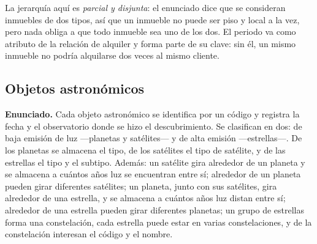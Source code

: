 La jerarquía aquí es \emph{parcial y disjunta}: el enunciado dice que se
consideran inmuebles de dos tipos, así que un inmueble no puede ser piso y local
a la vez, pero nada obliga a que todo inmueble sea uno de los dos. El periodo va
como atributo de la relación de alquiler y forma parte de su clave: sin él, un
mismo inmueble no podría alquilarse dos veces al mismo cliente.

\subsection{Objetos astronómicos}

\textbf{Enunciado.} Cada objeto astronómico se identifica por un código y
registra la fecha y el observatorio donde se hizo el descubrimiento. Se
clasifican en dos: de baja emisión de luz —planetas y satélites— y de alta
emisión —estrellas—. De los planetas se almacena el tipo, de los satélites el
tipo de satélite, y de las estrellas el tipo y el subtipo. Además: un satélite
gira alrededor de un planeta y se almacena a cuántos años luz se encuentran entre
sí; alrededor de un planeta pueden girar diferentes satélites; un planeta, junto
con sus satélites, gira alrededor de una estrella, y se almacena a cuántos años
luz distan entre sí; alrededor de una estrella pueden girar diferentes planetas;
un grupo de estrellas forma una constelación, cada estrella puede estar en varias
constelaciones, y de la constelación interesan el código y el nombre.

